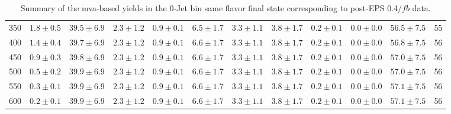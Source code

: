 \begin{table}
{\begin{center}
\begin{tabular}{l c c c c c c c c c c c }
350 & $1.8\pm0.5$ & $39.5\pm6.9$ & $2.3\pm1.2$ & $0.9\pm0.1$ & $6.5\pm1.7$ & $3.3\pm1.1$ & $3.8\pm1.7$ & $0.2\pm0.1$ & $0.0\pm0.0$ & $56.5\pm7.5$ & 55 \\
400 & $1.4\pm0.4$ & $39.7\pm6.9$ & $2.3\pm1.2$ & $0.9\pm0.1$ & $6.6\pm1.7$ & $3.3\pm1.1$ & $3.8\pm1.7$ & $0.2\pm0.1$ & $0.0\pm0.0$ & $56.8\pm7.5$ & 56 \\
450 & $0.9\pm0.3$ & $39.8\pm6.9$ & $2.3\pm1.2$ & $0.9\pm0.1$ & $6.6\pm1.7$ & $3.3\pm1.1$ & $3.8\pm1.7$ & $0.2\pm0.1$ & $0.0\pm0.0$ & $57.0\pm7.5$ & 56 \\
500 & $0.5\pm0.2$ & $39.9\pm6.9$ & $2.3\pm1.2$ & $0.9\pm0.1$ & $6.6\pm1.7$ & $3.3\pm1.1$ & $3.8\pm1.7$ & $0.2\pm0.1$ & $0.0\pm0.0$ & $57.0\pm7.5$ & 56 \\
550 & $0.3\pm0.1$ & $39.9\pm6.9$ & $2.3\pm1.2$ & $0.9\pm0.1$ & $6.6\pm1.7$ & $3.3\pm1.1$ & $3.8\pm1.7$ & $0.2\pm0.1$ & $0.0\pm0.0$ & $57.1\pm7.5$ & 56 \\
600 & $0.2\pm0.1$ & $39.9\pm6.9$ & $2.3\pm1.2$ & $0.9\pm0.1$ & $6.6\pm1.7$ & $3.3\pm1.1$ & $3.8\pm1.7$ & $0.2\pm0.1$ & $0.0\pm0.0$ & $57.1\pm7.5$ & 56 \\
\hline
\end{tabular}
\end{center}
}
\caption{Summary of the mva-based yields in the 0-Jet bin same flavor final state corresponding to post-EPS 0.4$/fb$ data.}
\end{table}
